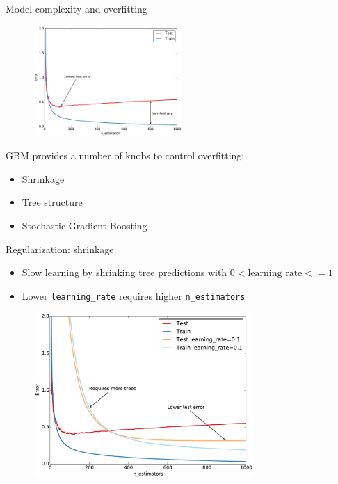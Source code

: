 \documentclass{beamer}
\begin{document}
\begin{frame}[fragile]{Model complexity and overfitting}

   \begin{figure}
     \centering
       \includegraphics[width=0.5\textwidth]{figures/overfitting.pdf}
   \end{figure}


     GBM provides a number of knobs to control overfitting:
     \begin{itemize}
       \item Shrinkage
       \item Tree structure
       \item Stochastic Gradient Boosting
     \end{itemize}
\end{frame}


\begin{frame}{Regularization: shrinkage}

    \begin{itemize}
      \item Slow learning by shrinking tree predictions with $0 < \text{learning\_rate} <= 1$
      \item Lower \texttt{learning\_rate} requires higher \texttt{n\_estimators}
    \end{itemize}

   \begin{figure}
     \centering
       \includegraphics[width=0.75\textwidth]{figures/regularization-learning-rate.pdf}
   \end{figure}

\end{frame}
\end{document}
